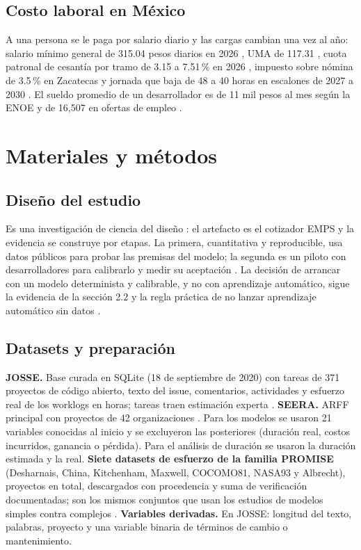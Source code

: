 \documentclass[10pt,twocolumn]{article}
\begin{document}
\subsection{Costo laboral en México}
A una persona se le paga por salario diario y las cargas cambian una vez al año: salario mínimo general de 315.04 pesos diarios en 2026 \cite{minimos2025resolucion}, UMA de 117.31 \cite{estadistica2026unidad}, cuota patronal de cesantía por tramo de 3.15 a 7.51\,\% en 2026 \cite{contribuyente2025asi}, impuesto sobre nómina de 3.5\,\% en Zacatecas \cite{zacatecas2024decreto} y jornada que baja de 48 a 40 horas en escalones de 2027 a 2030 \cite{republica2026decreto}. El sueldo promedio de un desarrollador es de 11 mil pesos al mes según la ENOE \cite{economia2026desarrolladores} y de 16{,}507 en ofertas de empleo \cite{mexico2026sueldo}.

\section{Materiales y métodos}
\subsection{Diseño del estudio}
Es una investigación de ciencia del diseño \cite{hevner2004,peffers2007design,wieringa2014design}: el artefacto es el cotizador EMPS y la evidencia se construye por etapas. La primera, cuantitativa y reproducible, usa datos públicos para probar las premisas del modelo; la segunda es un piloto con desarrolladores para calibrarlo y medir su aceptación \cite{davis1989perceived,venkatesh2003user}. La decisión de arrancar con un modelo determinista y calibrable, y no con aprendizaje automático, sigue la evidencia de la sección 2.2 y la regla práctica de no lanzar aprendizaje automático sin datos \cite{zinkevich2025rules}.

\subsection{Datasets y preparación}
\textbf{JOSSE.} Base curada en SQLite (18 de septiembre de 2020) con \nJosse{} tareas de 371 proyectos de código abierto, texto del issue, comentarios, actividades y esfuerzo real de los worklogs en horas; \nJosseExp{} tareas traen estimación experta \cite{alhamed2022josse}.
\textbf{SEERA.} ARFF principal con \nSeera{} proyectos de 42 organizaciones \cite{mustafa2020seera}. Para los modelos se usaron 21 variables conocidas al inicio y se excluyeron las posteriores (duración real, costos incurridos, ganancia o pérdida). Para el análisis de duración se usaron la duración estimada y la real.
\textbf{Siete datasets de esfuerzo de la familia PROMISE} (Desharnais, China, Kitchenham, Maxwell, COCOMO81, NASA93 y Albrecht), \nuevoNproyectosPublicos{} proyectos en total, descargados con procedencia y suma de verificación documentadas; son los mismos conjuntos que usan los estudios de modelos simples contra complejos \cite{menzies2017negative,abedu2021machine}.
\textbf{Variables derivadas.} En JOSSE: longitud del texto, palabras, proyecto y una variable binaria de términos de cambio o mantenimiento.
\end{document}
